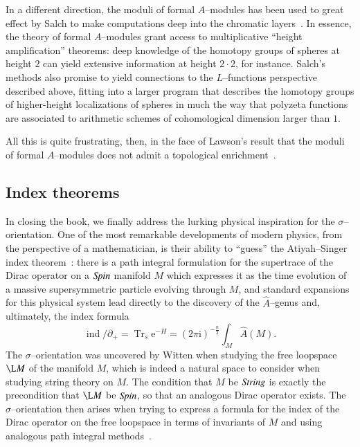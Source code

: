 In a different direction, the moduli of formal $A$--modules has been used to great effect by Salch to make computations deep into the chromatic layers~\cite{Salch}.  In essence, the theory of formal $A$--modules grant access to multiplicative ``height amplification'' theorems: deep knowledge of the homotopy groups of spheres at height $2$ can yield extensive information at height $2 \cdot 2$, for instance.  Salch's methods also promise to yield connections to the $L$--functions perspective described above, fitting into a larger program that describes the homotopy groups of higher-height localizations of spheres in much the way that polyzeta functions are associated to arithmetic schemes of cohomological dimension larger than $1$.

All this is quite frustrating, then, in the face of Lawson's result that the moduli of formal $A$--modules does not admit a topological enrichment~\cite{LawsonRealizability}.



\subsection*{Index theorems}

In closing the book, we finally address the lurking physical inspiration for the $\sigma$--orientation.  One of the most remarkable developments of modern physics, from the perspective of a mathematician, is their ability to ``guess'' the Atiyah--Singer index theorem~\cite[Section 8.6]{Takhtajan}: there is a path integral formulation for the supertrace of the Dirac operator on a $\mathit{Spin}$ manifold $M$ which expresses it as the time evolution of a massive supersymmetric particle evolving through $M$, and standard expansions for this physical system lead directly to the discovery of the $\widehat A$--genus and, ultimately, the index formula \[\operatorname{ind} /\!\!\!\partial_+ = \operatorname{Tr}_s \mathrm e^{-H} = (2 \pi \mathrm i)^{-\frac{n}{2}} \int_M \widehat A(M).\]  The $\sigma$--orientation was uncovered by Witten when studying the free loopspace $\L M$ of the manifold $M$, which is indeed a natural space to consider when studying string theory on $M$.  The condition that $M$ be $\mathit{String}$ is exactly the precondition that $\L M$ be $\mathit{Spin}$, so that an analogous Dirac operator exists.  The $\sigma$--orientation then arises when trying to express a formula for the index of the Dirac operator on the free loopspace in terms of invariants of $M$ and using analogous path integral methods~\cite{SegalEll}.

